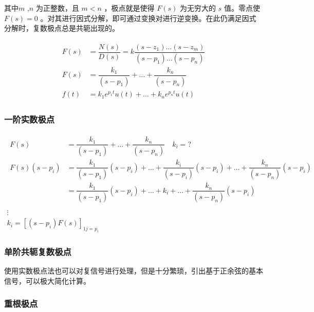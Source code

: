 \documentclass[cn,11pt,chinese,black,simple]{../elegantbook}
\begin{document}
其中\(m\) ,\(n\) 为正整数，且 \(m<n\) ，极点就是使得 \(F(s)\) 为无穷大的 \(s\) 值。零点使 \(F(s) = 0\) 。对其进行因式分解，即可通过变换对进行逆变换。在此仍满足因式分解时，复数极点总是共轭出现的。


\[\begin{array}{l}
    \begin{aligned}
        
        F(s)&=\dfrac{N(s)}{D(s)}=k \dfrac{\left(s-z_{1}\right) \dots\left(s-z_{m}\right)}{\left(s-p_{1}\right) \dots\left(s-p_{n}\right)} \\
        F(s)&=\dfrac{k_{1}}{\left(s-p_{1}\right)}+\ldots+\dfrac{k_{n}}{\left(s-p_{n}\right)} \\
        f(t)&=k_{1} e^{p_{1} t} u(t)+\ldots+k_{n} e^{p_{n} t} u(t)
    \end{aligned}
\end{array}\]

\subsubsection{一阶实数极点}

\[\begin{array}{c}
    \begin{aligned}
        F(s)&=\dfrac{k_{1}}{\left(s-p_{1}\right)}+\ldots+\dfrac{k_{n}}{\left(s-p_{n}\right)} \quad k_{i}=? \\
        F(s)\left(s-p_{i}\right)&=\dfrac{k_{1}}{\left(s-p_{1}\right)}\left(s-p_{i}\right)+\ldots+\dfrac{k_{i}}{\left(s-p_{i}\right)}\left(s-p_{i}\right)+\ldots+\dfrac{k_{n}}{\left(s-p_{n}\right)}\left(s-p_{i}\right) \\
        &=\dfrac{k_{1}}{\left(s-p_{1}\right)}\left(s-p_{i}\right)+\ldots+k_{i}+\ldots+\dfrac{k_{n}}{\left(s-p_{n}\right)}\left(s-p_{i}\right) \\
    \end{aligned}\\
    \vdots \\
    k_{i}=\left[\left(s-p_{i}\right) F(s)\right]_{1 j=p_{i}}
\end{array}\]

\subsubsection{单阶共轭复数极点}

使用实数极点法也可以对复信号进行处理，但是十分繁琐，引出基于正余弦的基本信号，可以极大简化计算。

\subsubsection{重根极点}
\end{document}
